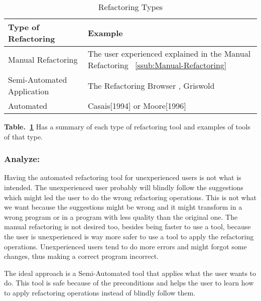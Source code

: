 


\begin{table}[h]
\caption{Refactoring Types}
\label{tab-Refactoring-Types}
\begin{tabular}{|l|l|}
\hline
\textbf{Type of Refactoring} & \textbf{Example}                                                                             \\ \hline
Manual Refactoring           & The user experienced explained in the Manual Refactoring ~\ref{ssub:Manual-Refactoring}      \\ \hline
Semi-Automated Application   & The Refactoring Browser \cite{roberts1997refactoring}, Griswold \cite{griswold1993automated} \\ \hline
Automated                    & Casais[1994] \cite{casais1994automatic} or Moore[1996] \cite{moore1996automatic}             \\ \hline
\end{tabular}
\end{table}



{\bf Table.~\ref{tab-Refactoring-Types}} Has a summary of each type of refactoring tool and examples of tools of that type.

\subsubsection{Analyze:}
Having the automated refactoring tool for unexperienced users is not what is intended. The unexperienced user probably will blindly follow the suggestions which might led the user to do the wrong refactoring operations.
This is not what we want because the suggestions might be wrong and it might transform in a wrong program or in a program with less quality than the original one.
The manual refactoring is not desired too, besides being faster to use a tool, because the user is unexperienced is way more safer to use a tool to apply the refactoring operations. 
Unexperienced users tend to do more errors and might forgot some changes, thus making a correct program incorrect.

The ideal approach is a Semi-Automated tool that applies what the user wants to do. 
This tool is safe because of the preconditions and helps the user to learn how to apply refactoring operations instead of blindly follow them.

